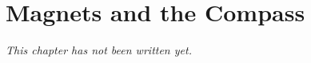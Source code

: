 \chapter{Magnets and the Compass}\label{ch:g4:magnets-and-compass}


\emph{This chapter has not been written yet.}
